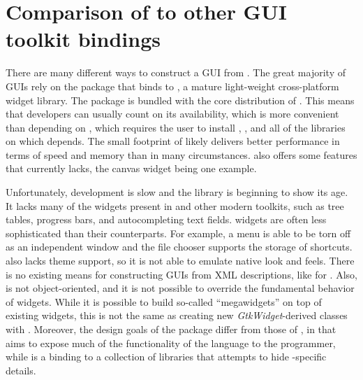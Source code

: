 \documentclass[article]{jss}
\begin{document}
\section[Comparison of RGtk2 to other R GUI toolkit bindings]{Comparison of  to other  GUI toolkit bindings}\label{sec:comparison}

There are many different ways to construct a GUI from . The great
majority of  GUIs rely on the  package that binds 
 to  \citep{ousterhout,welch}, a mature light-weight cross-platform
widget library. The  package \citep{Rnews:Dalgaard:2001a, Rnews:Dalgaard:2002} 
is bundled with the core distribution of 
. This means that developers can usually count on its availability, which
is more convenient than depending on , which requires the user
to install , , and all of the libraries on which 
depends. The small footprint of  likely delivers better performance in
terms of speed and memory than  in many circumstances. 
also offers some features that currently  lacks, the canvas widget
being one example.

Unfortunately,  development is slow and the library is beginning
to show its age. It lacks many of the widgets present in  and
other modern toolkits, such as tree tables, progress bars, and autocompleting
text fields.  widgets are often less sophisticated than their
 counterparts. For example, a  menu is able to be torn off
as an independent window and the  file chooser supports the storage
of shortcuts.  also lacks theme support, so it is not able to
emulate native look and feels. There is no existing means
for constructing  GUIs from XML descriptions, like 
\citep{libglade} for . Also,  is not object-oriented,
and it is not possible to override the fundamental behavior of widgets.
While it is possible to build so-called ``megawidgets'' on top of existing
 widgets, this is not the same as creating new \emph{GtkWidget}-derived
classes with . Moreover, the design goals of the  package
differ from those of , in that  aims to expose much of the 
functionality of the  language to the  programmer, while 
 is a binding to a collection of  libraries that attempts 
to hide -specific details.
\end{document}
